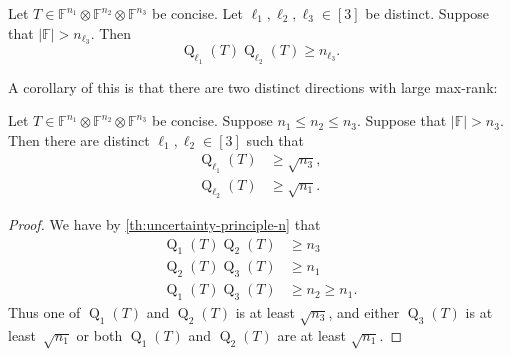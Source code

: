 \documentclass{daj}
\DeclareMathOperator{\subrank}{Q}
\newcommand{\FF}{\mathbb{F}}
\begin{document}
\begin{theorem}\label{th:uncertainty-principle-n}
    Let $T \in \FF^{n_1} \otimes \FF^{n_2} \otimes \FF^{n_3}$ be concise. Let ${\ell_1}, {\ell_2}, {\ell_3} \in [3]$ be distinct. Suppose that $|\FF|>n_{\ell_3}$. Then 
    \[
    \subrank_{\ell_1}(T)\subrank_{\ell_2}(T) \geq n_{\ell_3}.
    \]
\end{theorem}

%

%

%

A corollary of this is that there are two distinct directions with large max-rank:

\begin{corollary} %
\label{cor:twoLargeRankDirs}
    Let $T\in\FF^{n_1}\otimes\FF^{n_2}\otimes\FF^{n_3}$ be concise.
    Suppose $n_1 \leq n_2 \leq n_3$. Suppose that $|\FF| > n_3$. 
    Then there are distinct ${\ell_1},{\ell_2}\in[3]$ such that
    \begin{align*}\subrank_{\ell_1}(T) &\geq \sqrt{n_3},\\
    \subrank_{\ell_2}(T) &\geq \sqrt{n_1}.
    \end{align*}
\end{corollary}
%
\begin{proof}%
    We have by \autoref{th:uncertainty-principle-n} that
    \begin{align*}
    \subrank_1(T) \subrank_2(T) &\geq n_3\\
    \subrank_2(T) \subrank_3(T) &\geq n_1\\
    \subrank_1(T) \subrank_3(T) &\geq n_2 \geq n_1.
    \end{align*}
    Thus one of $\subrank_1(T)$ and $\subrank_2(T)$ is at least $\sqrt{n_3}$, and either $\subrank_3(T)$ is at least~$\sqrt{n_1}$ or both $\subrank_1(T)$ and $\subrank_2(T)$ are at least $\sqrt{n_1}$.
\end{proof}

%

%
%
%
%
%
%
%
%
%
%
%
%
%
%

%
%
%
%
%
%
%
%
%
%
%
%
%
%
%
%
%
%
%
%
%
%
%
%
%
     
%

%
%

%
%
%
%
%
%
%

%

%

%
%
%

%

%
%

%
%
%
%
\end{document}
